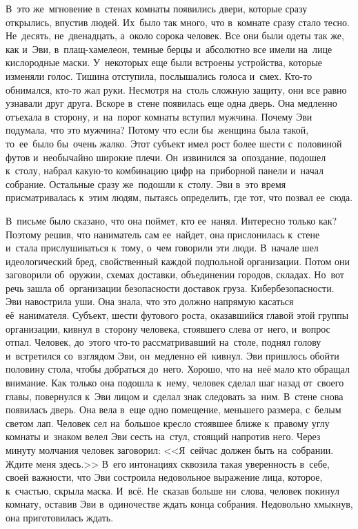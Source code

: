В~это же~мгновение в~стенах комнаты появились двери, которые сразу открылись, впустив людей.
Их~было так много, что в~комнате сразу стало тесно.
Не~десять, не~двенадцать, а~около сорока человек.
Все они были одеты так же, как и~Эви, в~плащ-хамелеон, темные берцы и~абсолютно все имели на~лице кислородные маски.
У~некоторых еще были встроены устройства, которые изменяли голос.
Тишина отступила, послышались голоса и~смех.
Кто-то обнимался, кто-то жал руки.
Несмотря на~столь сложную защиту, они все равно узнавали друг друга.
Вскоре в~стене появилась еще одна дверь.
Она медленно отъехала в~сторону, и~на~порог комнаты вступил мужчина.
Почему Эви подумала, что это мужчина? Потому что если бы~женщина была такой, то~ее~было бы~очень жалко.
Этот субъект имел рост более шести с~половиной футов и~необычайно широкие плечи.
Он~извинился за~опоздание, подошел к~столу, набрал какую-то комбинацию цифр на~приборной панели и~начал собрание.
Остальные сразу же~подошли к~столу.
Эви в~это время присматривалась к~этим людям, пытаясь определить, где тот, что позвал ее~сюда.

В~письме было сказано, что она поймет, кто ее~нанял.
Интересно только как? Поэтому решив, что наниматель сам ее~найдет, она прислонилась к~стене и~стала прислушиваться к~тому, о~чем говорили эти люди.
В~начале шел идеологический бред, свойственный каждой подпольной организации.
Потом они заговорили об~оружии, схемах доставки, объединении городов, складах.
Но~вот речь зашла об~организации безопасности доставок груза.
Кибербезопасности.
Эви навострила уши.
Она знала, что это должно напрямую касаться её~нанимателя.
Субъект, шести футового роста, оказавшийся главой этой группы организации, кивнул в~сторону человека, стоявшего слева от~него, и~вопрос отпал.
Человек, до~этого что-то рассматривавший на~столе, поднял голову и~встретился со~взглядом Эви, он~медленно ей~кивнул.
Эви пришлось обойти половину стола, чтобы добраться до~него.
Хорошо, что на~неё мало кто обращал внимание.
Как только она подошла к~нему, человек сделал шаг назад от~своего главы, повернулся к~Эви лицом и~сделал знак следовать за~ним.
В~стене снова появилась дверь.
Она вела в~еще одно помещение, меньшего размера, с~белым светом лап.
Человек сел на~большое кресло стоявшее ближе к~правому углу комнаты и~знаком велел Эви сесть на~стул, стоящий напротив него.
Через минуту молчания человек заговорил: <<Я~сейчас должен быть на~собрании.
Ждите меня здесь.>>
В~его интонациях сквозила такая уверенность в~себе, своей важности, что Эви состроила недовольное выражение лица, которое, к~счастью, скрыла маска.
И~всё.
Не~сказав больше ни~слова, человек покинул комнату, оставив Эви в~одиночестве ждать конца собрания.
Недовольно хмыкнув, она приготовилась ждать.

